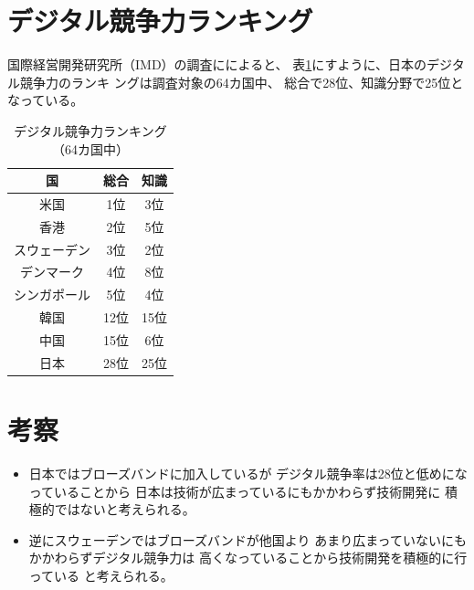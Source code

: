 \documentclass[a4paper,11pt,dvipdfmx]{ujarticle}
\begin{document}
\section{デジタル競争力ランキング}
国際経営開発研究所（IMD）の調査に\cite{imd}によると、
表\ref{2}にすように、日本のデジタル競争力のランキ
ングは調査対象の64カ国中、
総合で28位、知識分野で25位となっている。
\begin{table}[htbp]
    \centering
    \caption{デジタル競争力ランキング（64カ国中）}
    \label{2}
    \begin{tabular}{|c|c|c|}
        \hline
        国 & 総合 & 知識 \\
        \hline
        米国 & 1位 & 3位 \\
        \hline
        香港 & 2位 & 5位 \\
        \hline
        スウェーデン & 3位 & 2位 \\
        \hline
        デンマーク & 4位 & 8位 \\
        \hline
        シンガポール & 5位 & 4位 \\
        \hline
        \hline
        韓国 & 12位 & 15位 \\
        \hline
        中国 & 15位 & 6位 \\
        \hline
        \hline
        日本 & 28位 & 25位 \\
        \hline

    \end{tabular}
\end{table}


\section{考察}
\begin{itemize}
    \item 日本ではブローズバンドに加入しているが
    デジタル競争率は28位と低めになっていることから
    日本は技術が広まっているにもかかわらず技術開発に
    積極的ではないと考えられる。
    \item 逆にスウェーデンではブローズバンドが他国より
    あまり広まっていないにもかかわらずデジタル競争力は
    高くなっていることから技術開発を積極的に行っている
    と考えられる。
\end{itemize}
%
%


\end{document}
